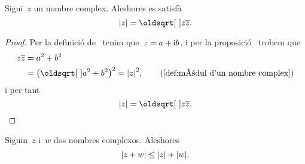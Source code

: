 \documentclass[../Apunts.tex]{subfiles}
\begin{document}
    \begin{proposition}
        \label{prop:el mòdul d'un nombre complex és l'arrel del nombre %
        pel seu conjugat}
        Sigui~\(z\) un nombre complex.
        Aleshores es satisfà
        \[\modul{z}=\sqrt{z\conjugat{z}}.\]
    \end{proposition}
    \begin{proof}
        Per la definició de~ tenim que~\(z=a+\mathrm{i} b\),
        i per la proposició~
        trobem que
        \begin{align*}
            z\conjugat{z}&=a^{2}+b^{2} \\
            &=\big(\sqrt{a^{2}+b^{2}}\big)^{2}=\modul{z}^{2}, \tag{\ref{def:mòdul d'un nombre complex}}
        \end{align*}
        i per tant 
        \[\modul{z}=\sqrt{z\conjugat{z}}.\qedhere\]
    \end{proof}
    \begin{proposition}
        \label{prop:desigualta triangular nombres complexos}
        Siguin~\(z\) i~\(w\) dos nombres complexos.
        Aleshores
        \[\modul{z+w}\leq\modul{z}+\modul{w}.\]
    \end{proposition}
\end{document}
